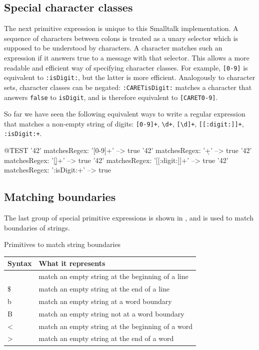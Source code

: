 \documentclass[10pt,twoside,chapterprefix=false]{scrbook}
\newcommand{\codecolor}{\color{blue!65}}
\renewcommand{\ct}{\lstinline[mathescape=false,basicstyle={\sffamily\upshape}]}
\renewcommand{\lct}[1]{{\codecolor\textsf{\textup{#1}}}}
\begin{document}
{%
\subsection{Special character classes}
The next primitive expression is unique to this Smalltalk implementation. A sequence of characters between colons is treated as a unary selector which is supposed to be understood by characters. A character matches such an expression if it answers true to a message with that selector. This allows a more readable and efficient way of specifying character classes. For example, \ct{[0-9]} is equivalent to \ct{:isDigit:}, but the latter is more efficient. Analogously to character sets, character classes can be negated: \ct{:CARETisDigit:} matches a character that answers \ct{false} to \ct{isDigit}, and is therefore equivalent to \ct{[CARET0-9]}.

So far we have seen the following equivalent ways to write a regular expression that matches a non-empty string of digits: \ct{[0-9]+}, \ct{\d+}, \ct{[\d]+}, \ct{[[:digit:]]+}, \ct{:isDigit:+}.

\begin{ToSh-code}{@TEST}
'42' matchesRegex: '[0-9]+'      --> true
'42' matchesRegex: '\d+'           --> true
'42' matchesRegex: '[\d]+'         --> true
'42' matchesRegex: '[[:digit:]]+' --> true
'42' matchesRegex: ':isDigit:+'  --> true
\end{ToSh-code}

\subsection{Matching boundaries}
The last group of special primitive expressions is shown in , and is used to match boundaries of strings.

\begin{table}[htb]
	\begin{margincap}{Primitives to match string boundaries}
	\centering
	\begin{tabular}{lp{8cm}}
		\toprule
		Syntax & What it represents \\
		\midrule
		\lct{\caret} & match an empty string at the beginning of a line\\
		\lct{\$} & match an empty string at the end of a line\\
		\lct{{\escape}b} & match an empty string at a word boundary\\
		\lct{{\escape}B} & match an empty string not at a word boundary\\
		\lct{{\escape}<} & match an empty string at the beginning of a word\\
		\lct{{\escape}>} & match an empty string at the end of a word\\
		\bottomrule
	\end{tabular}
	\end{margincap}
\end{table}

}
\end{document}
